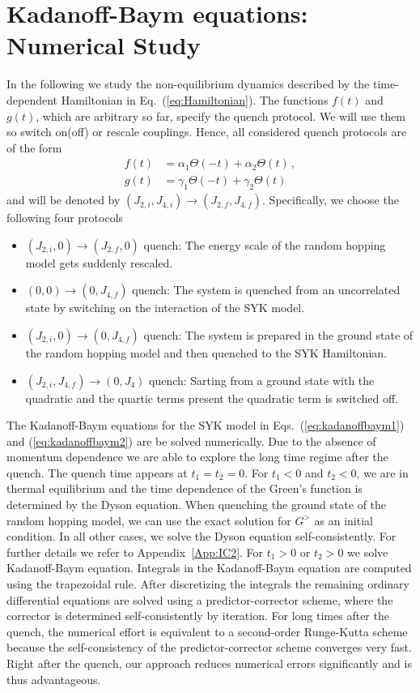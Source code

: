 \documentclass[prx,aps,onecolumn,amsfonts,showpacs,superscriptaddress,preprint,eqsecnum]
{revtex4-1}
\begin{document}
\section{Kadanoff-Baym equations: Numerical Study}
\label{sec:num}
In the following we study the non-equilibrium dynamics described by the 
time-dependent Hamiltonian in Eq.~(\ref{eq:Hamiltonian}). The functions $f(t)$ and 
$g(t)$, which are arbitrary so far, specify the quench protocol. We will use them
so switch on(off) or rescale couplings. Hence, all considered quench protocols are of the
form 
\begin{align}
    f(t) &= \alpha_1 \Theta(-t) + \alpha_2 \Theta(t) \, , \nonumber		\\
    g(t) &= \gamma_1 \Theta(-t) + \gamma_2 \Theta(t)	
\end{align}
and will be denoted by $(J_{2,i},J_{4,i}) \rightarrow (J_{2,f},J_{4,f})$. 
Specifically, we choose the following four protocols
\begin{itemize}
	\item[A)] $(J_{2,i},0) \rightarrow (J_{2,f},0)$  %
	quench: The energy scale of the random hopping model gets suddenly rescaled.

\item[B)]  $(0,0) \rightarrow (0,J_{4,f})$ %
quench: The system is quenched from an uncorrelated 
state by switching on the interaction of the SYK model.
\item[C)]  $(J_{2,i},0) \rightarrow (0,J_{4,f})$ %
quench: The system is prepared in the ground state of the
random hopping model and then quenched to the SYK Hamiltonian. 
\item[D)]  $(J_{2,i},J_{4,f}) \rightarrow (0,J_4)$ %
quench: Sarting from a ground state with  
the quadratic and the quartic terms present the quadratic term is switched off.
\end{itemize}

The Kadanoff-Baym equations for the SYK model in Eqs.~(\ref{eq:kadanoffbaym1}) and (\ref{eq:kadanoffbaym2})
are be solved numerically. Due to the absence of momentum dependence we are able to explore the long time regime after the quench. The quench time appears at $t_1 = t_2 = 0$. For $t_1 < 0$ and $t_2 < 0$, we are in thermal equilibrium and the time dependence of the Green's function is determined by the Dyson equation. 
When quenching the ground state of the random hopping model, we can use the exact solution for $G^>$ as an initial condition. In all other cases, we solve the 
Dyson equation self-consistently. For further details we refer to Appendix~\ref{App:IC2}.
For $t_1 > 0$ or $t_2 > 0$ we solve Kadanoff-Baym equation. Integrals in the Kadanoff-Baym equation are computed using the trapezoidal rule. After discretizing the integrals the remaining ordinary differential equations are solved using a predictor-corrector scheme, where the corrector is determined self-consistently by iteration. For long times after the quench, the numerical effort is equivalent to a second-order Runge-Kutta scheme because the self-consistency of the predictor-corrector scheme converges very fast. Right after the quench, our approach reduces numerical errors significantly and is thus advantageous.
\end{document}
